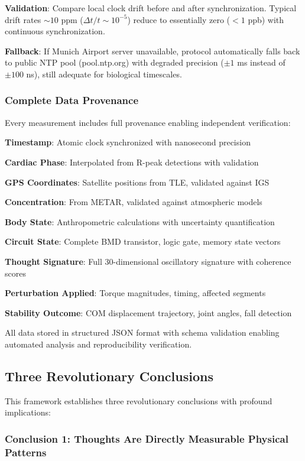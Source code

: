 \documentclass[11pt,onecolumn]{article}
\begin{document}
\textbf{Validation}: Compare local clock drift before and after synchronization. Typical drift rates $\sim 10$ ppm ($\Delta t / t \sim 10^{-5}$) reduce to essentially zero ($< 1$ ppb) with continuous synchronization.

\textbf{Fallback}: If Munich Airport server unavailable, protocol automatically falls back to public NTP pool (pool.ntp.org) with degraded precision ($\pm 1$ ms instead of $\pm 100$ ns), still adequate for biological timescales.

\subsubsection{Complete Data Provenance}

Every measurement includes full provenance enabling independent verification:

\textbf{Timestamp}: Atomic clock synchronized with nanosecond precision

\textbf{Cardiac Phase}: Interpolated from R-peak detections with validation

\textbf{GPS Coordinates}: Satellite positions from TLE, validated against IGS

\textbf{ Concentration}: From METAR, validated against atmospheric models

\textbf{Body State}: Anthropometric calculations with uncertainty quantification

\textbf{Circuit State}: Complete BMD transistor, logic gate, memory state vectors

\textbf{Thought Signature}: Full 30-dimensional oscillatory signature with coherence scores

\textbf{Perturbation Applied}: Torque magnitudes, timing, affected segments

\textbf{Stability Outcome}: COM displacement trajectory, joint angles, fall detection

All data stored in structured JSON format with schema validation enabling automated analysis and reproducibility verification.

\subsection{Three Revolutionary Conclusions}

This framework establishes three revolutionary conclusions with profound implications:

\subsubsection{Conclusion 1: Thoughts Are Directly Measurable Physical Patterns}
\end{document}

